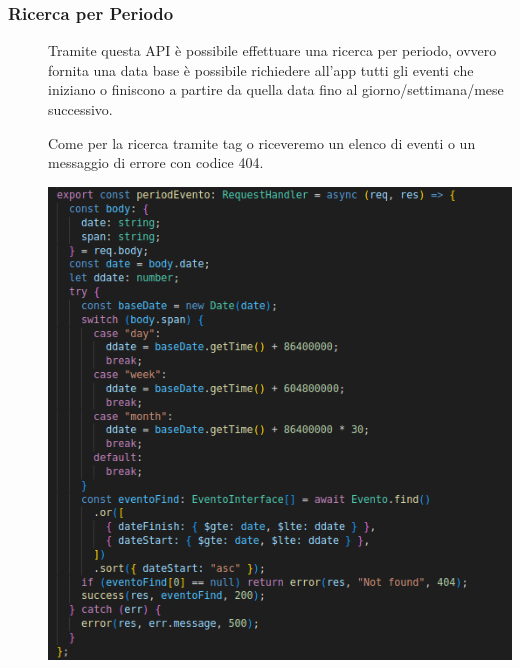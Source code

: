 \documentclass{article}
\begin{document}
\subsubsection{Ricerca per Periodo}
\begin{description}
    \item[] Tramite questa API è possibile effettuare una ricerca per periodo, ovvero fornita una data base è possibile richiedere all'app tutti gli eventi che iniziano o finiscono a partire da quella data fino al giorno/settimana/mese successivo.
    \item[] Come per la ricerca tramite tag o riceveremo un elenco di eventi o un messaggio di errore con codice 404.
    \item[] \begin{center}
            \includegraphics[scale=0.5]{periodoEvent.png}
        \end{center}
\end{description}
\clearpage
\end{document}
